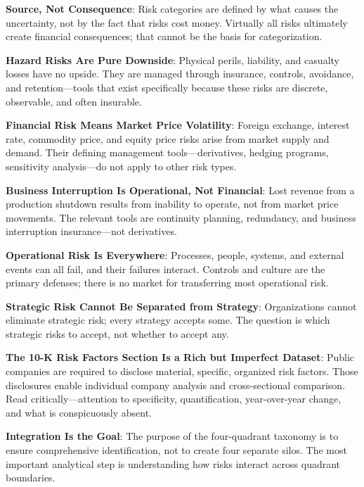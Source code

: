 \documentclass[11pt,openany]{book}
\begin{document}
\begin{keytakeaways}
  \item \textbf{Source, Not Consequence}: Risk categories are defined by what causes the uncertainty, not by the fact that risks cost money. Virtually all risks ultimately create financial consequences; that cannot be the basis for categorization.
  \item \textbf{Hazard Risks Are Pure Downside}: Physical perils, liability, and casualty losses have no upside. They are managed through insurance, controls, avoidance, and retention---tools that exist specifically because these risks are discrete, observable, and often insurable.
  \item \textbf{Financial Risk Means Market Price Volatility}: Foreign exchange, interest rate, commodity price, and equity price risks arise from market supply and demand. Their defining management tools---derivatives, hedging programs, sensitivity analysis---do not apply to other risk types.
  \item \textbf{Business Interruption Is Operational, Not Financial}: Lost revenue from a production shutdown results from inability to operate, not from market price movements. The relevant tools are continuity planning, redundancy, and business interruption insurance---not derivatives.
  \item \textbf{Operational Risk Is Everywhere}: Processes, people, systems, and external events can all fail, and their failures interact. Controls and culture are the primary defenses; there is no market for transferring most operational risk.
  \item \textbf{Strategic Risk Cannot Be Separated from Strategy}: Organizations cannot eliminate strategic risk; every strategy accepts some. The question is which strategic risks to accept, not whether to accept any.
  \item \textbf{The 10-K Risk Factors Section Is a Rich but Imperfect Dataset}: Public companies are required to disclose material, specific, organized risk factors. Those disclosures enable individual company analysis and cross-sectional comparison. Read critically---attention to specificity, quantification, year-over-year change, and what is conspicuously absent.
  \item \textbf{Integration Is the Goal}: The purpose of the four-quadrant taxonomy is to ensure comprehensive identification, not to create four separate silos. The most important analytical step is understanding how risks interact across quadrant boundaries.
\end{keytakeaways}
\end{document}
